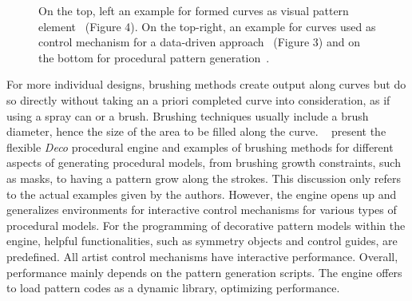\begin{figure}[H]
    \centering
    \caption{\label{fig:curves} On the top, left an example for formed curves as visual pattern element~\cite{xu_2009_mcc} (Figure 4)\color{red}{ Status rights: not started}. \color{black}On the top-right, an example for curves used as control mechanism for a data-driven approach~\cite{lu_2014_dds} (Figure 3) and on the bottom for procedural pattern generation~\cite{mech_2012_tdf}.}
\end{figure}

For more individual designs, brushing methods create output along curves but do so directly without taking an a priori completed curve into consideration, as if using a spray can or a brush. Brushing techniques usually include a brush diameter, hence the size of the area to be filled along the curve. \citeauthor*{mech_2012_tdf}~\cite{mech_2012_tdf} present the flexible \textit{Deco} procedural engine and examples of brushing methods for different aspects of generating procedural models, from brushing growth constraints, such as masks, to having a pattern grow along the strokes. This discussion only refers to the actual examples given by the authors. However, the engine opens up and generalizes environments for interactive control mechanisms for various types of procedural models. For the programming of decorative pattern models within the engine, helpful functionalities, such as symmetry objects and control guides, are predefined. All artist control mechanisms have interactive performance. Overall, performance mainly depends on the pattern generation scripts. The engine offers to load pattern codes as a dynamic library, optimizing performance. 

